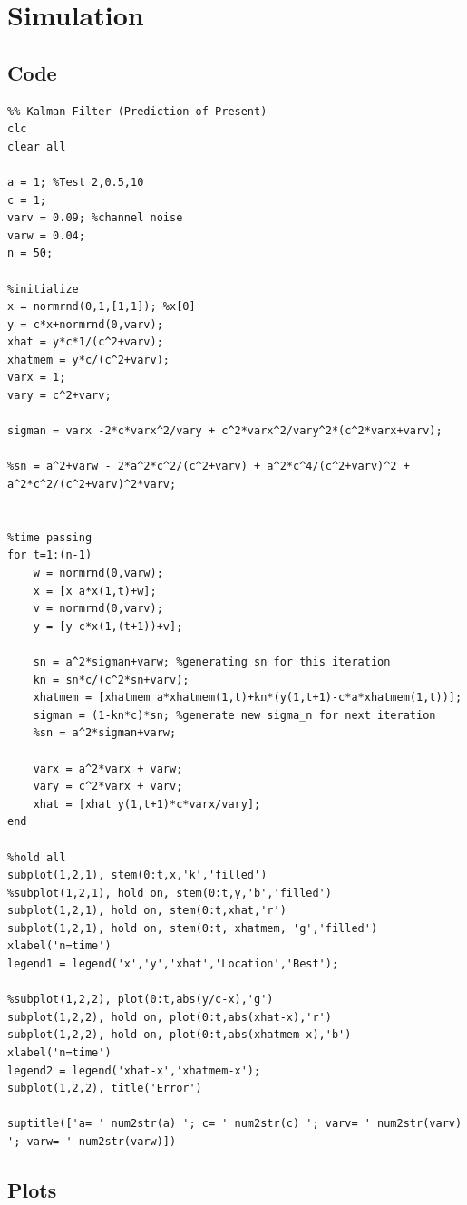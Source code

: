 \documentclass[leqno]{article}
\begin{document}
\section{Simulation}

\subsection{Code}
\begin{verbatim}
%% Kalman Filter (Prediction of Present)
clc
clear all

a = 1; %Test 2,0.5,10
c = 1;
varv = 0.09; %channel noise
varw = 0.04;
n = 50;

%initialize
x = normrnd(0,1,[1,1]); %x[0]
y = c*x+normrnd(0,varv);
xhat = y*c*1/(c^2+varv);
xhatmem = y*c/(c^2+varv);
varx = 1;
vary = c^2+varv;

sigman = varx -2*c*varx^2/vary + c^2*varx^2/vary^2*(c^2*varx+varv);

%sn = a^2+varw - 2*a^2*c^2/(c^2+varv) + a^2*c^4/(c^2+varv)^2 + a^2*c^2/(c^2+varv)^2*varv;


%time passing
for t=1:(n-1)
    w = normrnd(0,varw);
    x = [x a*x(1,t)+w];
    v = normrnd(0,varv);
    y = [y c*x(1,(t+1))+v];
    
    sn = a^2*sigman+varw; %generating sn for this iteration
    kn = sn*c/(c^2*sn+varv);
    xhatmem = [xhatmem a*xhatmem(1,t)+kn*(y(1,t+1)-c*a*xhatmem(1,t))];
    sigman = (1-kn*c)*sn; %generate new sigma_n for next iteration
    %sn = a^2*sigman+varw;
    
    varx = a^2*varx + varw;
    vary = c^2*varx + varv;
    xhat = [xhat y(1,t+1)*c*varx/vary];
end

%hold all
subplot(1,2,1), stem(0:t,x,'k','filled')
%subplot(1,2,1), hold on, stem(0:t,y,'b','filled')
subplot(1,2,1), hold on, stem(0:t,xhat,'r')
subplot(1,2,1), hold on, stem(0:t, xhatmem, 'g','filled')
xlabel('n=time')
legend1 = legend('x','y','xhat','Location','Best');

%subplot(1,2,2), plot(0:t,abs(y/c-x),'g')
subplot(1,2,2), hold on, plot(0:t,abs(xhat-x),'r')
subplot(1,2,2), hold on, plot(0:t,abs(xhatmem-x),'b')
xlabel('n=time')
legend2 = legend('xhat-x','xhatmem-x');
subplot(1,2,2), title('Error')

suptitle(['a= ' num2str(a) '; c= ' num2str(c) '; varv= ' num2str(varv) '; varw= ' num2str(varw)])
\end{verbatim}

\subsection{Plots}
\end{document}
